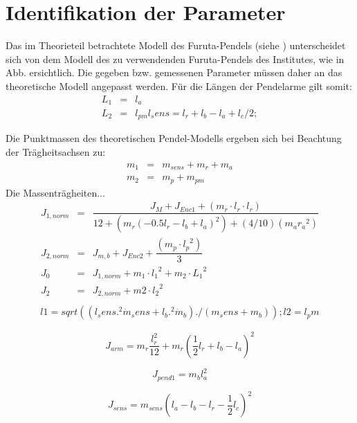 \section{Identifikation der Parameter}
Das im Theorieteil betrachtete Modell des Furuta-Pendels (siehe \citep{Cazzolato.2011}) unterscheidet sich von dem Modell des zu verwendenden Furuta-Pendels des Institutes, wie in Abb. %
ersichtlich.
Die gegeben bzw. gemessenen Parameter müssen daher an das theoretische Modell angepasst werden. Für die Längen der Pendelarme gilt somit:
\begin{eqnarray}
L_1 &=& l_a \nonumber \\
L_2 &=& l_{pm}
l_sens=l_r+l_b-l_a+l_c/2;
\end{eqnarray}


Die Punktmassen des theoretischen Pendel-Modells ergeben sich bei Beachtung der Trägheitsachsen zu:
\begin{eqnarray}
m_1 &=& m_{sens}+m_r+m_a \nonumber \\
m_2 &=& m_p+m_{pm}
\end{eqnarray}
Die Massenträgheiten... %
\begin{eqnarray}
J_{1,norm}&=&\dfrac{J_M +J_{Enc1}+(m_r \cdot l_r \cdot l_r)}{12+(m_r (-0.5 l_r-l_b+l_a)^2)+(4/10) (m_a  {r_a}^{2})} \\
J_{2,norm}&=& J_{m,b}+J_{Enc2}   + \dfrac{(m_p \cdot {l_p}^{2})}{3} \\
J_0&=&J_{1,norm}+ m_1 \cdot {l_1}^{2} + m_2 \cdot {L_1}^{2} \\ 
J_2&=&J_{2,norm}+m2 \cdot {l_2}^2           \\
\end{eqnarray}
\begin{eqnarray}
l1=sqrt((l_sens.^2 \dot m_sens+l_b.^2 \dot m_b)./(m_sens+m_b));
l2=l_pm
\end{eqnarray}

\begin{equation}
J_{arm} = m_r \frac{l^2_r}{12}+m_r(\frac{1}{2}l_r+l_b-l_a)^2
\end{equation}

\begin{equation}
J_{pend1}=m_bl^2_a
\end{equation}

\begin{equation}
J_{sens}=m_{sens}(l_a-l_b-l_r-\frac{1}{2}l_c)^2
\end{equation}

